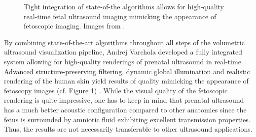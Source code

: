 \begin{figure}[ht]
	\centering
	\quad
	\caption[Comparison of an image acquired during fetoscopy with a fetoscopic rendering of 3D ultrasound.]{
		Tight integration of state-of-the algorithms allows for high-quality real-time fetal ultrasound imaging mimicking the appearance of fetoscopic imaging.
		Images from \cite{Varchola:2012:Fetoscopic}.
	}
	\label{fig:background:fetoscopic-rendering}
\end{figure}

By combining state-of-the-art algorithms throughout all steps of the volumetric ultrasound visualization pipeline, Andrej Varchola developed a fully integrated system allowing for high-quality renderings of prenatal ultrasound in real-time.
Advanced structure-preserving filtering, dynamic global illumination and realistic rendering of the human skin yield results of  quality mimicking the appearance of fetoscopy images (cf. Figure \ref{fig:background:fetoscopic-rendering}) \cite{Varchola:2012:Fetoscopic}.
While the visual quality of the fetoscopic rendering is quite impressive, one has to keep in mind that prenatal ultrasound has a much better acoustic configuration compared to other anatomies since the fetus is surrounded by amniotic fluid exhibiting excellent transmission properties.
Thus, the results are not necessarily transferable to other ultrasound applications.

